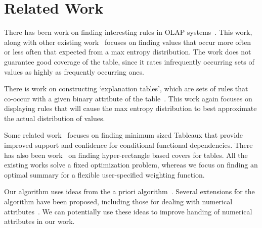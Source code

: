 

\section{Related Work}\label{sec:related}
There has been work on finding interesting rules in OLAP systems~\cite{Sarawagi:2001:UMA:767141.767148, Sarawagi00user-adaptiveexploration, Sarawagi98discovery-drivenexploration}. This work, along with other existing work~\cite{Mampaey:2011:TMI:2020408.2020499} focuses on finding values that occur more often or less often that expected from a max entropy distribution. The work does not guarantee good coverage of the table, since it rates infrequently occurring sets of values as highly as frequently occurring ones. 

There is work on constructing `explanation tables', which are sets of rules that co-occur with a given binary attribute of the table~\cite{DBLP:journals/pvldb/GebalyAGKS14}. This work again focuses on displaying rules that will cause the max entropy distribution to best approximate the actual distribution of values. 

Some related work~\cite{Golab_efficientand, Golab:2008:GNT:1453856.1453900} focuses on finding minimum sized Tableaux that provide improved support and confidence for conditional functional dependencies. There has also been work~\cite{Bu:2005:MSH:1083592.1083644, Lakshmanan:2002:GMA:1287369.1287435, Xiang_succinctsummarization, Geerts04tilingdatabases} on finding hyper-rectangle based covers for tables. All the existing works solve a fixed optimization problem, whereas  we focus on finding an optimal summary for a flexible user-specified weighting function.

Our algorithm uses ideas from the a priori algorithm~\cite{apriori}. Several extensions for the algorithm have been proposed, including those for dealing with numerical attributes~\cite{Srikant:1996:MQA:233269.233311}. We can potentially use these ideas to improve handing of numerical attributes in our work. 

